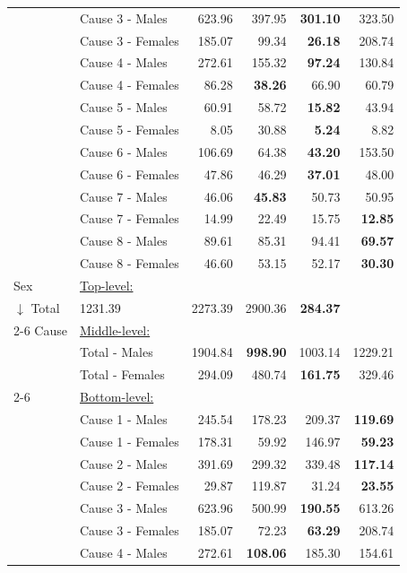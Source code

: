 \begin{center}
\begin{small}
\begin{longtable}{@{}llrrrr@{}}
& Cause 3 - Males & 623.96 & 397.95 & \textbf{301.10} & 323.50 \\
& Cause 3 - Females & 185.07 & 99.34 & \textbf{26.18} & 208.74 \\
& Cause 4 - Males & 272.61 & 155.32 & \textbf{97.24} & 130.84 \\
& Cause 4 - Females & 86.28 & \textbf{38.26} & 66.90 & 60.79 \\
& Cause 5 - Males & 60.91 & 58.72 & \textbf{15.82} & 43.94 \\
& Cause 5 - Females & 8.05 & 30.88 & \textbf{5.24} & 8.82 \\
& Cause 6 - Males & 106.69 & 64.38 & \textbf{43.20} & 153.50 \\
& Cause 6 - Females & 47.86 & 46.29 & \textbf{37.01} & 48.00 \\
& Cause 7 - Males & 46.06 & \textbf{45.83} & 50.73 & 50.95 \\
& Cause 7 - Females & 14.99 & 22.49 & 15.75 & \textbf{12.85} \\
& Cause 8 - Males & 89.61 & 85.31 & 94.41 & \textbf{69.57} \\
& Cause 8 - Females & 46.60 & 53.15 & 52.17 & \textbf{30.30} \\
\midrule
Sex & \multicolumn{5}{l}{\underline{Top-level:}}\\
$\downarrow$  Total & 1231.39 & 2273.39 & 2900.36 & \textbf{284.37} \\
\cmidrule{2-6}
Cause & \multicolumn{5}{l}{\underline{Middle-level:}}\\
& Total - Males & 1904.84 & \textbf{998.90} & 1003.14 & 1229.21 \\
& Total - Females & 294.09 & 480.74 & \textbf{161.75} & 329.46 \\
\cmidrule{2-6}
& \multicolumn{5}{l}{\underline{Bottom-level:}}\\
& Cause 1 - Males & 245.54 & 178.23 & 209.37 & \textbf{119.69} \\
& Cause 1 - Females & 178.31 & 59.92 & 146.97 & \textbf{59.23} \\
& Cause 2 - Males & 391.69 & 299.32 & 339.48 & \textbf{117.14} \\
& Cause 2 - Females & 29.87 & 119.87 & 31.24 & \textbf{23.55} \\
& Cause 3 - Males & 623.96 & 500.99 & \textbf{190.55} & 613.26 \\
& Cause 3 - Females & 185.07 & 72.23 & \textbf{63.29} & 208.74 \\
& Cause 4 - Males & 272.61 & \textbf{108.06} & 185.30 & 154.61 \\

\end{longtable}
\end{small}
\end{center}
